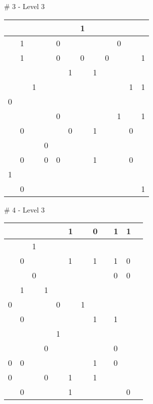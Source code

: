 \medskip

\# 3 - Level 3 \newline
\begin{tabular}{|m{\collen}|m{\collen}|m{\collen}|m{\collen}|m{\collen}|m{\collen}|m{\collen}|m{\collen}|m{\collen}|m{\collen}|m{\collen}|m{\collen}|}
\hline
    &   &   &   &   &   & 1 &   &   &   &   &   \\
\hline
    & 1 &   &   & 0 &   &   &   &   & 0 &   &   \\
\hline
    & 1 &   &   & 0 &   & 0 &   & 0 &   &   & 1 \\
\hline
    &   &   &   &   & 1 &   & 1 &   &   &   &   \\
\hline
    &   & 1 &   &   &   &   &   &   &   & 1 & 1 \\
\hline
  0 &   &   &   &   &   &   &   &   &   &   &   \\
\hline
    &   &   &   & 0 &   &   &   &   & 1 &   & 1 \\
\hline
    & 0 &   &   &   & 0 &   & 1 &   &   & 0 &   \\
\hline
    &   &   & 0 &   &   &   &   &   &   &   &   \\
\hline
    & 0 &   & 0 & 0 &   &   & 1 &   &   & 0 &   \\
\hline
  1 &   &   &   &   &   &   &   &   &   &   &   \\
\hline
    & 0 &   &   &   &   &   &   &   &   &   & 1 \\
\hline
\end{tabular}


\medskip

\# 4 - Level 3 \newline
\begin{tabular}{|m{\collen}|m{\collen}|m{\collen}|m{\collen}|m{\collen}|m{\collen}|m{\collen}|m{\collen}|m{\collen}|m{\collen}|m{\collen}|m{\collen}|}
\hline
    &   &   &   &   & 1 &   & 0 &   & 1 & 1 &   \\
\hline
    &   & 1 &   &   &   &   &   &   &   &   &   \\
\hline
    & 0 &   &   &   & 1 &   & 1 &   & 1 & 0 &   \\
\hline
    &   & 0 &   &   &   &   &   &   & 0 & 0 &   \\
\hline
    & 1 &   & 1 &   &   &   &   &   &   &   &   \\
\hline
  0 &   &   &   & 0 &   & 1 &   &   &   &   &   \\
\hline
    & 0 &   &   &   &   &   & 1 &   & 1 &   &   \\
\hline
    &   &   &   & 1 &   &   &   &   &   &   &   \\
\hline
    &   &   & 0 &   &   &   &   &   & 0 &   &   \\
\hline
  0 & 0 &   &   &   &   &   & 1 &   & 0 &   &   \\
\hline
  0 &   &   & 0 &   & 1 &   & 1 &   &   &   &   \\
\hline
    & 0 &   &   &   & 1 &   &   &   &   & 0 &   \\
\hline
\end{tabular}


